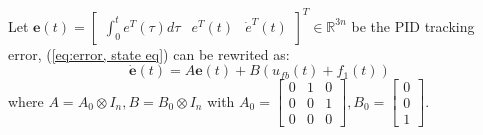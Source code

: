 \documentclass{ieeeaccess}
\begin{document}
Let $\pmb{e}(t)=\begin{bmatrix}
    \int_{0}^{t}e^T(\tau)d\tau & e^T(t) & \dot{e}^T(t)
\end{bmatrix}^T\in\mathbb{R}^{3n}$ be the PID tracking error, (\ref{eq:error, state eq}) can be rewrited as:
\begin{equation} \label{eq:linear f1}
    \dot{\pmb{e}}(t)=A\pmb{e}(t)+B(u_{fb}(t)+f_1(t))
\end{equation}
where $ A = A_0\otimes I_n, B = B_0\otimes I_n$
with $A_0 = \begin{bmatrix}
    0 & 1 & 0 \\ 0 & 0 & 1 \\ 0 & 0 & 0
\end{bmatrix}, B_0 = \begin{bmatrix}
0 \\ 0 \\ 1
\end{bmatrix}$. 
\end{document}
